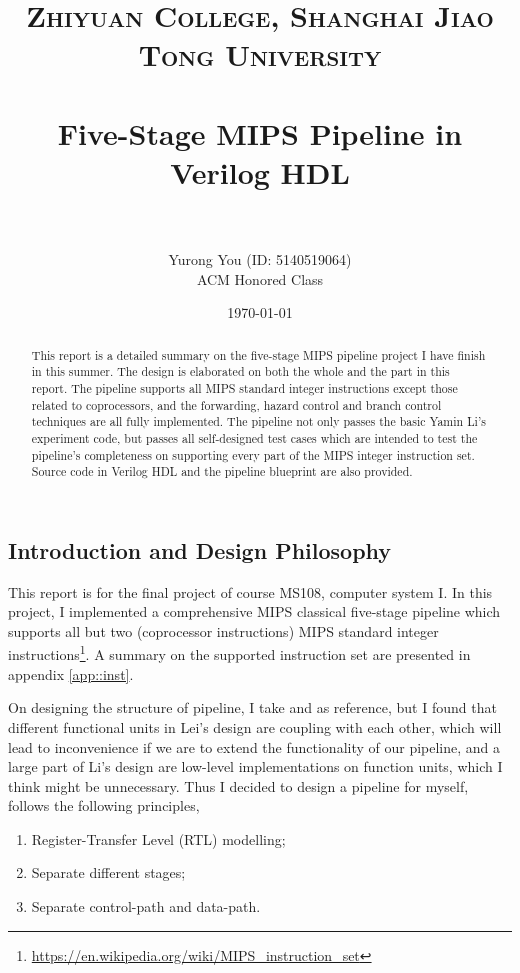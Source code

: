 \documentclass[paper=a4, fontsize=11pt]{scrartcl} %
\title{	
\normalfont \normalsize 
\textsc{Zhiyuan College, Shanghai Jiao Tong University} \\ %
\horrule{0.5pt} \\[0.4cm] %
\huge Five-Stage MIPS Pipeline in Verilog HDL \\ %
\horrule{2pt} \\ %
}
\author{
\normalsize
	Yurong You (ID: 5140519064)\\
\normalsize
	ACM Honored Class
} %
\date{\normalsize\today} %
\numberwithin{equation}{section} %
\numberwithin{figure}{section} %
\numberwithin{table}{section} %
\begin{document}
\maketitle %
\begin{spacing}{1.5}
\renewcommand{\abstractname}{\scshape \bfseries \large Abstract}
\begin{abstract}
	This report is a detailed summary on the five-stage MIPS pipeline project I have finish in this summer. The design is elaborated on both the whole and the part in this report. The pipeline supports all MIPS standard integer instructions except those related to coprocessors, and the forwarding, hazard control and branch control techniques are all fully implemented. The pipeline not only passes the basic Yamin Li's experiment code, but passes all self-designed test cases which are intended to test the pipeline's completeness on supporting every part of the MIPS integer instruction set. Source code in Verilog HDL and the pipeline blueprint are also provided.
\end{abstract}
\newpage
\renewcommand{\contentsname}{\scshape \bfseries \Large Contents}
\tableofcontents

\newpage
\section{Introduction and Design Philosophy}
	This report is for the final project of course MS108, computer system I. In this project, I implemented a comprehensive MIPS classical five-stage pipeline which supports all but two (coprocessor instructions) MIPS standard integer instructions\footnote{\url{https://en.wikipedia.org/wiki/MIPS_instruction_set}}. A summary on the supported instruction set are presented in appendix \ref{app::inst}.
	
	On designing the structure of pipeline, I take \cite{lsl} and \cite{lym} as reference, but I found that different functional units in Lei's design are coupling with each other, which will lead to inconvenience if we are to extend the functionality of our pipeline, and a large part of Li's design are low-level implementations on function units, which I think might be unnecessary. Thus I decided to design a pipeline for myself, follows the following principles,
	
	\begin{spacing}{1.0}
	\begin{enumerate}
		\item Register-Transfer Level (RTL) modelling;
		\item Separate different stages;
		\item Separate control-path and data-path.
	\end{enumerate}
	\end{spacing}
	

\end{spacing}
\end{document}
